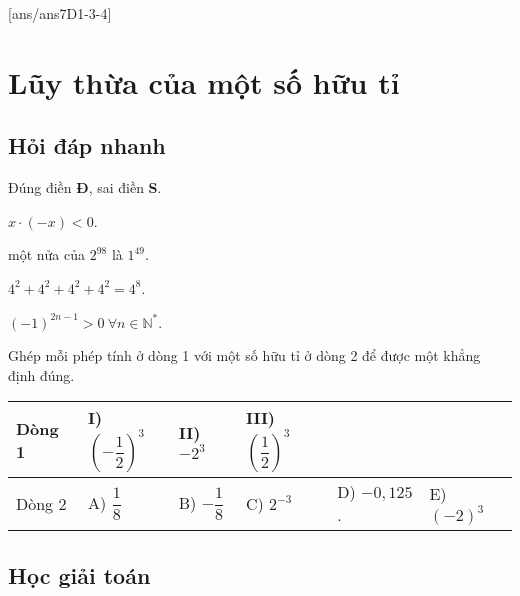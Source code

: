 [ans/ans7D1-3-4]

\section{Lũy thừa của một số hữu tỉ}
\subsection{Hỏi đáp nhanh}

\begin{ex}%
Đúng điền \textbf{Đ}, sai điền \textbf{S}.
\begin{listEX}[2]
	\item {} $x\cdot(-x)<0$.
	\item {} một nửa của $2^{98}$ là $1^{49}$.
	\item {} $4^2+4^2+4^2+4^2=4^8$.
	\item {} $(-1)^{2n-1}>0~\forall n\in\mathbb{N}^*$.
\end{listEX}
\end{ex}

\begin{ex}%
	Ghép mỗi phép tính ở dòng 1 với một số hữu tỉ ở dòng 2 để được một khẳng định đúng.
	\begin{center}
		\begin{tabular}{|l|l|l|l|l|l|}
		\hline
		Dòng 1 & I) $\left(-\dfrac{1}{2}\right)^3$
		       & II) $-2^3$
		       & III) $\left(\dfrac{1}{2}\right)^3$
		       && \\\hline
		Dòng 2 & A) $\dfrac{1}{8}$
		       & B) $-\dfrac{1}{8}$
		       & C) $2^{-3}$
		       & D) $-0{,}125$.
		       & E) $(-2)^3$ \\\hline
	\end{tabular}
	\end{center}
\end{ex}

\subsection{Học giải toán}

